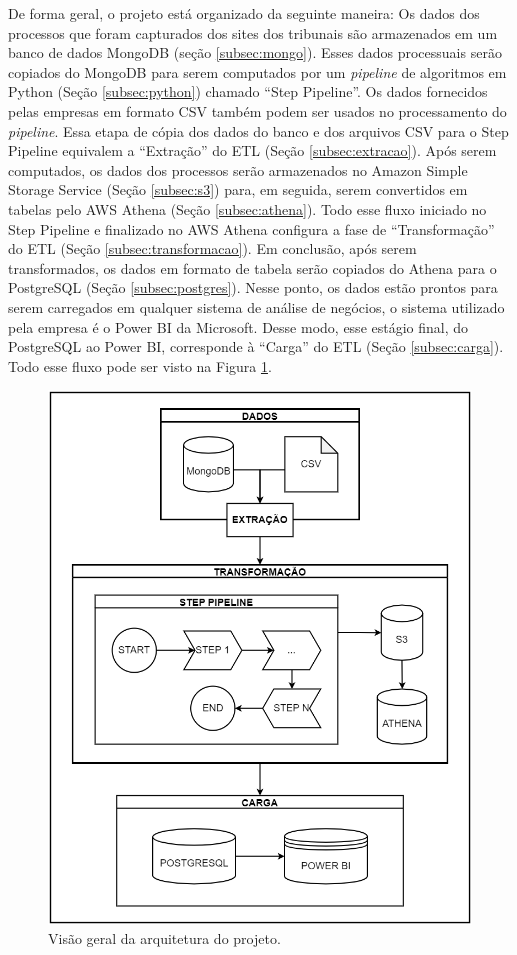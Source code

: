 De forma geral, o projeto está organizado da seguinte maneira: Os dados dos processos que foram capturados dos sites dos tribunais são armazenados em um banco de dados MongoDB (seção \ref{subsec:mongo}). Esses dados processuais serão copiados do MongoDB para serem computados por um \textit{pipeline} de algoritmos em Python (Seção \ref{subsec:python}) chamado \enquote{Step Pipeline}. Os dados fornecidos pelas empresas em formato CSV também podem ser usados no processamento do \textit{pipeline}. Essa etapa de cópia dos dados do banco e dos arquivos CSV para o Step Pipeline equivalem a \enquote{Extração} do ETL (Seção \ref{subsec:extracao}). Após serem computados, os dados dos processos serão armazenados no Amazon Simple Storage Service (Seção \ref{subsec:s3}) para, em seguida, serem convertidos em tabelas pelo AWS Athena (Seção \ref{subsec:athena}). Todo esse fluxo iniciado no Step Pipeline e finalizado no AWS Athena configura a fase de \enquote{Transformação} do ETL (Seção \ref{subsec:transformacao}). Em conclusão, após serem transformados, os dados em formato de tabela serão copiados do Athena para o PostgreSQL (Seção \ref{subsec:postgres}). Nesse ponto, os dados estão prontos para serem carregados em qualquer sistema de análise de negócios, o sistema utilizado pela empresa é o Power BI da Microsoft. Desse modo, esse estágio final, do PostgreSQL ao Power BI, corresponde à \enquote{Carga} do ETL (Seção \ref{subsec:carga}). Todo esse fluxo pode ser visto na Figura \ref{fig:arquiteturaGeral}.

\begin{figure}[ht]
\centering
\includegraphics[width=.6\textwidth]{imagens/arquitetura_geral.png}
\caption{Visão geral da arquitetura do projeto.}
\label{fig:arquiteturaGeral}
\end{figure}

